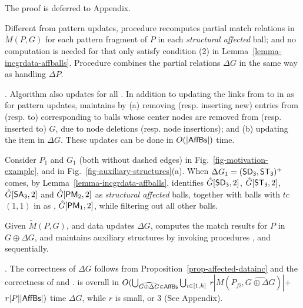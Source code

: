 The proof is deferred to Appendix.

Different from pattern updates, procedure \incmatch recomputes partial match relations in $\tilde{M}(P,G)$
for each pattern fragment of $P$ in each {\em structural affected} ball;
and no computation is needed for \affballsx that only satisfy condition (2) in Lemma~\ref{lemma-incgrdata-affballs}.
Procedure \comb combines the partial relations \wrt $\Delta G$ in the same way as handling $\Delta P$.


. Algorithm \incd also updates \fb for all \affballsx.
In addition to updating the links from \fs to \bs in \fb as for pattern updates,
\incd maintains \bs by
(a) removing (resp. inserting new) entries from (resp. to) \bs corresponding to balls whose center nodes are removed from (resp. inserted to) $G$, due to node deletions (resp. node insertions);
and (b) updating the  item in \bs \wrt $\Delta G$.
These updates can be done in $O(|{\mathsf{AffBs}}|)$ time.


\begin{example}
\label{exa-Ginc}
Consider $P_1$ and $G_1$ (both without dashed edges) in Fig.~\ref{fig-motivation-example}, and \fb in Fig.~\ref{fig-auxiliary-structures}(a).
When $\Delta G_1=({\mathsf{SD_3}},{\mathsf{ST_3}})^+$ comes,
by Lemma~\ref{lemma-incgrdata-affballs},
\identifyaffball identifies $\hat{G}{[{\mathsf{SD_3}}, 2]}$, $\hat{G}{[{\mathsf{ST_3}},2]}$, $\hat{G}{[{\mathsf{SA_3}}, 2]}$ and $\hat{G}{[{\mathsf{PM_2}}, 2]}$ as {\em structural affected} balls,
together with balls with $tc$ $(1, 1)$ in \fb as \affballsx, \ie $\hat{G}{[{\mathsf{PM_1}}, 2]}$, while filtering out all other balls.
\end{example}


 Given $\tilde{M}(P,G)$, \fb and data updates $\Delta G$,
\incd computes the match results for $P$ in $G \oplus \Delta G$, and maintains
auxiliary structures by invoking procedures \identifyaffball, \incmatch and \comb sequentially.


. The correctness of \incd \wrt $\Delta G$ follows from Proposition~\ref{prop-affected-datainc} and the correctness of \incmatch and \comb.
\incd is overall in
$O(\bigcup_{\widehat{G\oplus\Delta G}\in {\ensuremath {\mathsf{AffBs}}}}\bigcup_{i\in[1,h]}$ $r|M(P_{fi}, \widehat{G\oplus\Delta G})|$+$r|P||{\mathsf{AffBs}}|)$ time \wrt $\Delta G$, while $r$ is small,  or 3  (See Appendix).



